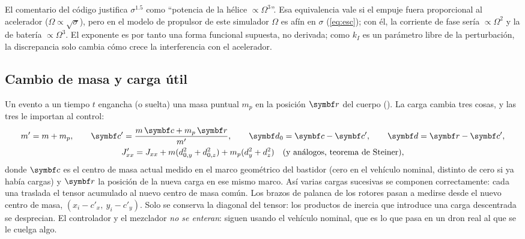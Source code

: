 \begin{supuesto}[El exponente 1.5]
El comentario del código justifica $\sigma^{1.5}$ como ``potencia de la
hélice $\propto\Omega^3$''. Esa equivalencia vale si el empuje fuera
proporcional al acelerador ($\Omega\propto\sqrt\sigma$), pero en el modelo de
propulsor de este simulador $\Omega$ es afín en $\sigma$
(\cref{eq:esc}); con él, la corriente de fase sería $\propto\Omega^2$ y la de
batería $\propto\Omega^3$. El exponente es por tanto una forma funcional
supuesta, no derivada; como $k_I$ es un parámetro libre de la
perturbación, la discrepancia solo cambia cómo crece la interferencia con el
acelerador.
\end{supuesto}

\subsection{Cambio de masa y carga útil}

Un evento a un tiempo $t$ engancha (o suelta) una masa puntual $m_p$ en la
posición $\vect r$ del cuerpo (). La carga cambia
tres cosas, y las tres le importan al control:
\begin{gather}
m'=m+m_p,\qquad \vect c'=\frac{m\,\vect c+m_p\,\vect r}{m'},\qquad
\vect d_0=\vect c-\vect c',\qquad \vect d=\vect r-\vect c',\label{eq:carga}\\
J'_{xx}=J_{xx}+m(d_{0,y}^2+d_{0,z}^2)+m_p(d_y^2+d_z^2)\quad\text{(y análogos, teorema de Steiner)},\nonumber
\end{gather}
donde $\vect c$ es el centro de masa actual medido en el marco geométrico del
bastidor (cero en el vehículo nominal, distinto de cero si ya había cargas)
y $\vect r$ la posición de la nueva carga en ese mismo marco. Así varias
cargas sucesivas se componen correctamente: cada una traslada el tensor
acumulado al nuevo centro de masa común. Los brazos de palanca de los rotores pasan a medirse desde el nuevo
centro de masa, $(x_i-c'_x,\ y_i-c'_y)$. Solo se conserva la diagonal del
tensor: los productos de inercia que introduce una carga descentrada se
desprecian. El controlador y el mezclador \emph{no se enteran}: siguen
usando el vehículo nominal, que es lo que pasa en un dron real al que se le
cuelga algo.

